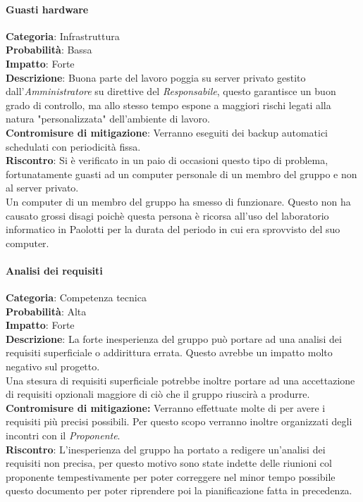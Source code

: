 \documentclass{scalatekids-article}
\begin{document}
\paragraph{Guasti hardware}
\textbf{Categoria}: Infrastruttura\\
\textbf{Probabilità}: Bassa\\
\textbf{Impatto}: Forte\\
\textbf{Descrizione}: Buona parte del lavoro poggia su server privato gestito dall'\textit{Amministratore} su direttive del \textit{Responsabile},
questo garantisce un buon grado di controllo, ma allo stesso tempo espone a maggiori rischi legati alla natura "personalizzata" dell'ambiente di lavoro.\\
\textbf{Contromisure di mitigazione}: Verranno eseguiti dei backup automatici schedulati con periodicità fissa.\\
\textbf{Riscontro}: 
Si è verificato in un paio di occasioni questo tipo di problema, fortunatamente guasti ad un computer personale di un membro del gruppo e non al server privato.\\Un computer di un membro del gruppo ha smesso di funzionare. Questo non ha causato grossi disagi poichè questa persona è ricorsa all'uso del laboratorio informatico in Paolotti per la durata del periodo in cui era sprovvisto del suo computer.
\paragraph{Analisi dei requisiti}
\textbf{Categoria}: Competenza tecnica\\
\textbf{Probabilità}: Alta\\
\textbf{Impatto}: Forte\\
\textbf{Descrizione}: La forte inesperienza del gruppo può portare ad una analisi dei requisiti superficiale o addirittura errata. Questo avrebbe un impatto molto negativo sul progetto.\\Una stesura di requisiti superficiale potrebbe inoltre portare ad una accettazione di requisiti opzionali maggiore di ciò che il gruppo riuscirà a produrre.\\
\textbf{Contromisure di mitigazione:} Verranno effettuate molte  di  per avere i requisiti più precisi possibili. Per questo scopo verranno inoltre organizzati degli incontri con il \textit{Proponente}.\\
\textbf{Riscontro}: L'inesperienza del gruppo ha portato a redigere un'analisi dei requisiti non precisa, per questo motivo sono state indette delle riunioni col proponente tempestivamente per poter correggere nel minor tempo possibile questo documento per poter riprendere poi la pianificazione fatta in precedenza.\\
\end{document}
